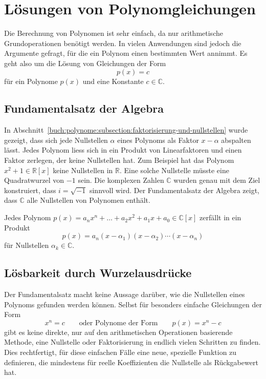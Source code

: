 %
%
%
\section{Lösungen von Polynomgleichungen
\label{buch:potenzen:section:loesungen}}
Die Berechnung von Polynomen ist sehr einfach, da nur arithmetische 
Grundoperationen benötigt werden.
In vielen Anwendungen sind jedoch die Argumente gefragt, für die ein
Polynom einen bestimmten Wert annimmt.
Es geht also um die Lösung von Gleichungen der Form
\[
p(x) = c
\]
für ein Polynome $p(x)$ und eine Konstante $c\in\mathbb{C}$.

%
%
\subsection{Fundamentalsatz der Algebra}
In Abschnitt~\ref{buch:polynome:subsection:faktorisierung-und-nullstellen}
wurde gezeigt, dass sich jede Nullstellen $\alpha$ eines Polynoms als
Faktor $x-\alpha$ abspalten lässt.
Jedes Polynom liess sich in ein Produkt von Linearfaktoren und
einen Faktor zerlegen, der keine Nullstellen hat.
Zum Beispiel hat das Polynom $x^2+1\in\mathbb{R}[x]$ keine
Nullstellen in $\mathbb{R}$.
Eine solche Nullstelle müsste eine Quadratwurzel von $-1$ sein.
Die komplexen Zahlen $\mathbb{C}$ wurden genau mit dem Ziel konstruiert,
dass $i=\sqrt{-1}$ sinnvoll wird.
Der Fundamentalsatz der Algebra zeigt, dass $\mathbb{C}$ alle
Nullstellen von Polynomen enthält.

\begin{satz}[Gauss]
%
%
\label{buch:potenzen:satz:fundamentalsatz}
Jedes Polynom $p(x)=a_nx^n+\dots + a_2x^2 + a_1x + a_0\in\mathbb{C}[x]$
zerfällt in ein Produkt
\[
p(x)
=
a_n
(x-\alpha_1)(x-\alpha_2)\cdots(x-\alpha_n)
\]
für Nullstellen $\alpha_k\in\mathbb{C}$.
\end{satz}


%
%
\subsection{Lösbarkeit durch Wurzelausdrücke}
Der Fundamentalsatz macht keine Aussage darüber, wie die Nullstellen
eines Polynoms gefunden werden können.
Selbst für besonders einfache Gleichungen der Form
\[
x^n = c
\qquad
\text{oder Polynome der Form}
\qquad
p(x) = x^n -c
\]
gibt es keine direkte, nur auf den arithmetischen
Operationen basierende Methode, eine Nullstelle oder Faktorisierung
in endlich vielen Schritten zu finden.
Dies rechtfertigt, für diese einfachen Fälle eine neue, spezielle
Funktion zu definieren, die mindestens für reelle Koeffizienten 
die Nullstelle als Rückgabewert hat.

